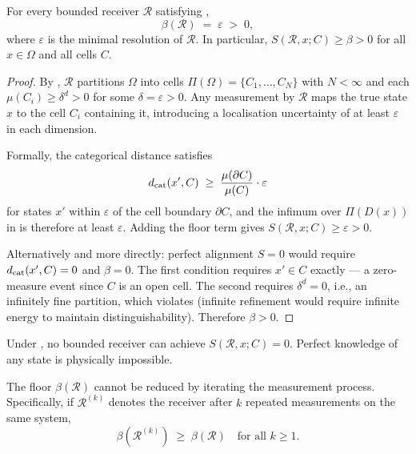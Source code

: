 \begin{theorem}
\label{thm:floor-positivity}
For every bounded receiver $\mathcal{R}$ satisfying
,
\[
  \beta(\mathcal{R}) \;=\; \varepsilon \;>\; 0 ,
\]
where $\varepsilon$ is the minimal resolution of $\mathcal{R}$.  In
particular, $S(\mathcal{R}, x; C) \geq \beta > 0$ for all $x \in \Omega$
and all cells $C$.
\end{theorem}

\begin{proof}
By , $\mathcal{R}$ partitions $\Omega$ into cells
$\Pi(\Omega) = \{C_1, \ldots, C_N\}$ with $N < \infty$ and each
$\mu(C_i) \geq \delta^d > 0$ for some $\delta = \varepsilon > 0$.  Any
measurement by $\mathcal{R}$ maps the true state $x$ to the cell $C_i$
containing it, introducing a localisation uncertainty of at least
$\varepsilon$ in each dimension.

Formally, the categorical distance satisfies
\[
  d_{\mathrm{cat}}(x', C) \;\geq\; \frac{\mu(\partial C)}{\mu(C)} \cdot \varepsilon
\]
for states $x'$ within $\varepsilon$ of the cell boundary $\partial C$,
and the infimum over $\Pi(D(x))$ in  is therefore
at least $\varepsilon$.  Adding the floor term gives
$S(\mathcal{R}, x; C) \geq \varepsilon > 0$.

Alternatively and more directly: perfect alignment $S = 0$ would require
$d_{\mathrm{cat}}(x', C) = 0$ and $\beta = 0$.  The first condition requires $x' \in C$
exactly — a zero-measure event since $C$ is an open cell.  The second requires
$\delta^d = 0$, i.e., an infinitely fine partition, which violates
 (infinite refinement would require infinite energy
to maintain distinguishability).  Therefore $\beta > 0$.
\end{proof}

\begin{corollary}
\label{cor:no-perfect-knowledge}
Under , no bounded receiver
can achieve $S(\mathcal{R}, x; C) = 0$.  Perfect knowledge of any state is
physically impossible.
\end{corollary}

\begin{theorem}
\label{thm:residue-persistence}
The floor $\beta(\mathcal{R})$ cannot be reduced by iterating the measurement
process.  Specifically, if $\mathcal{R}^{(k)}$ denotes the receiver after $k$
repeated measurements on the same system,
\[
  \beta(\mathcal{R}^{(k)}) \;\geq\; \beta(\mathcal{R}) \quad \text{for all } k \geq 1 .
\]
\end{theorem}

